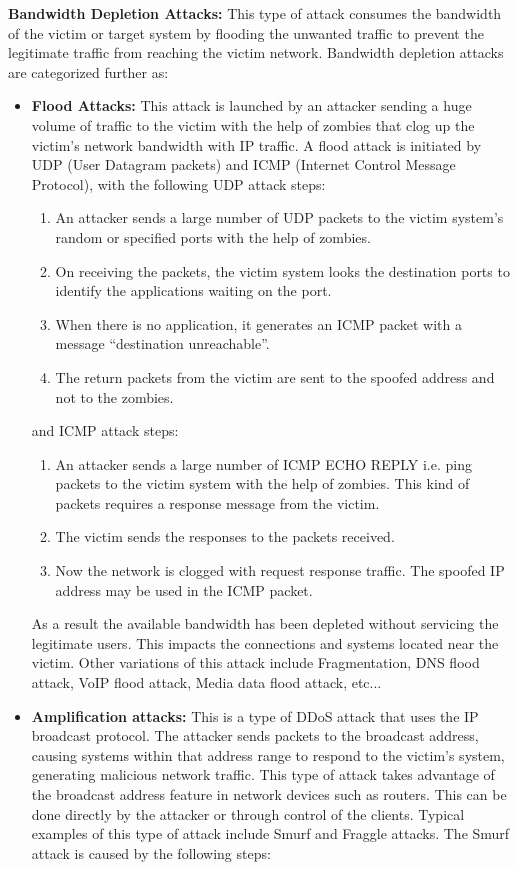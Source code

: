 \documentclass{ijitcs}
\begin{document}
\textbf{Bandwidth Depletion Attacks:} This type of attack consumes the bandwidth of the victim or target system by flooding the unwanted traffic to prevent the legitimate traffic from reaching the victim network. Bandwidth depletion attacks are categorized further as:
\begin{itemize}
    \item \textbf{Flood Attacks:} This attack is launched by an attacker sending a huge volume of traffic to the victim with the help of zombies that clog up the victim’s network bandwidth with IP traffic. A flood attack is initiated by UDP (User Datagram packets) and ICMP (Internet Control Message Protocol), with the following UDP attack steps\cite{deshmukh2015understanding}:
    \begin{enumerate}
        \item An attacker sends a large number of UDP packets to the victim system’s random or specified ports with the help of zombies.
        \item On receiving the packets, the victim system looks the destination ports to identify the applications waiting on the port.
        \item When there is no application, it generates an ICMP packet with a message “destination unreachable”.
        \item The return packets from the victim are sent to the spoofed address and not to the zombies.
    \end{enumerate}
    and ICMP attack steps\cite{deshmukh2015understanding}:
    \begin{enumerate}
        \item An attacker sends a large number of ICMP ECHO REPLY i.e. ping packets to the victim system with the help of zombies. This kind of packets requires a response message from the victim.
        \item The victim sends the responses to the packets received.
        \item Now the network is clogged with request response traffic. The spoofed IP address may be used in the ICMP packet.
    \end{enumerate}
    As a result the available bandwidth has been depleted without servicing the legitimate users. This impacts the
connections and systems located near the victim. Other variations of this attack include Fragmentation, DNS
flood attack, VoIP flood attack, Media data flood attack, etc...
    \item \textbf{Amplification attacks:} This is a type of DDoS attack that uses the IP broadcast protocol. The attacker sends packets to the broadcast address, causing systems within that address range to respond to the victim's system, generating malicious network traffic. This type of attack takes advantage of the broadcast address feature in network devices such as routers. This can be done directly by the attacker or through control of the clients. Typical examples of this type of attack include Smurf and Fraggle attacks. The Smurf attack is caused by the following steps\cite{deshmukh2015understanding}:

\end{itemize}
\end{document}
